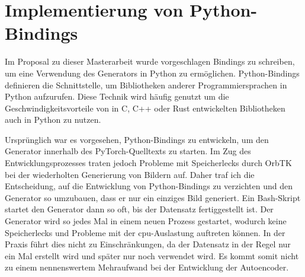 \section{Implementierung von Python-Bindings}
Im Proposal zu dieser Masterarbeit wurde vorgeschlagen Bindings zu schreiben, um eine Verwendung des Generators in Python zu ermöglichen.
Python-Bindings definieren die Schnittstelle, um Bibliotheken anderer Programmiersprachen in Python aufzurufen. Diese Technik wird häufig genutzt um die Geschwindigkeitsvorteile von in C, C++ oder Rust entwickelten Bibliotheken auch in Python zu nutzen.

Ursprünglich war es vorgesehen, Python-Bindings zu entwickeln, um den Generator innerhalb des PyTorch-Quelltexts zu starten. Im Zug des Entwicklungsprozesses traten jedoch Probleme mit Speicherlecks durch OrbTK bei der wiederholten Generierung von Bildern auf. Daher traf ich die Entscheidung, auf die Entwicklung von Python-Bindings zu verzichten und den Generator so umzubauen, dass er nur ein einziges Bild generiert. Ein Bash-Skript startet den Generator dann so oft, bis der Datensatz fertiggestellt ist. Der Generator wird so jedes Mal in einem neuen Prozess gestartet, wodurch keine Speicherlecks und Probleme mit der \gls{cpu}-Auslastung auftreten können. In der Praxis führt dies nicht zu Einschränkungen, da der Datensatz in der Regel nur ein Mal erstellt wird und später nur noch verwendet wird. Es kommt somit nicht zu einem nennenswertem Mehraufwand bei der Entwicklung der Autoencoder.




